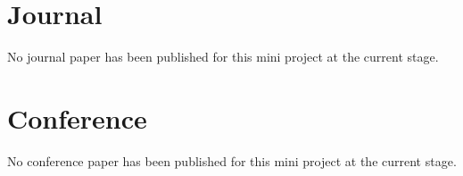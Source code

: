 \newpage
\justifying
\section*{Journal}
No journal paper has been published for this mini project at the current stage.

\section*{Conference}
No conference paper has been published for this mini project at the current stage.
